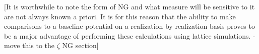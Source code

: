 [It is worthwhile to note the form of NG and what measure will be sensitive to it are not always known a priori.
It is for this reason that the ability to make comparisons to a baseline potential on a realization by realization basis proves to be a major advantage of performing these calculations using lattice simulations. - move this to the $\zeta$ NG section]

